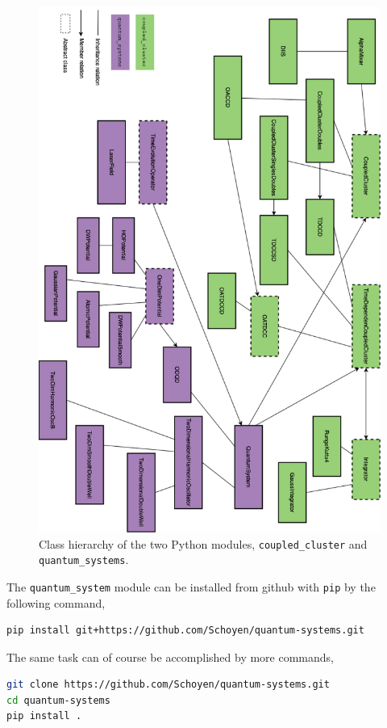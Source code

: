 \begin{figure}
    \centering
    \includegraphics[width=\textwidth]{implementation/figures/taifun_class_diagram.png}
    \caption{Class hierarchy of the two Python modules, \lstinline{coupled_cluster}
    and \lstinline{quantum_systems}.}
    \label{fig:class_diagram_quantum_systems}
\end{figure}

The \lstinline{quantum_system} module can be installed from github with \lstinline{pip}
by the following command,
\begin{lstlisting}[language=bash]
pip install git+https://github.com/Schoyen/quantum-systems.git
\end{lstlisting}
The same task can of course be accomplished by more commands,
\begin{lstlisting}[language=bash]
git clone https://github.com/Schoyen/quantum-systems.git
cd quantum-systems
pip install .
\end{lstlisting}

